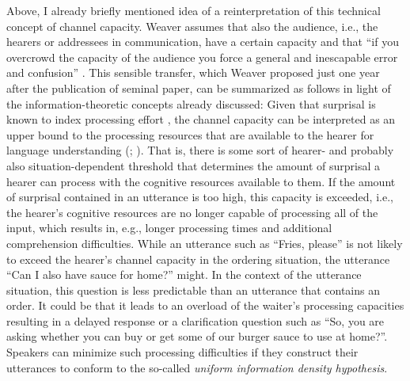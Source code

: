 Above, I already briefly mentioned  idea of a reinterpretation of this technical concept of channel capacity.  
Weaver assumes that also the audience, i.e., the hearers or addressees in communication, have a certain capacity and that ``if you overcrowd the capacity of the audience you force a general and inescapable error and confusion'' \citep[27]{weaver1949}.
This sensible transfer, which Weaver proposed just one year after the publication of  seminal paper, can be summarized as follows in light of the information-theoretic concepts already discussed:
Given that surprisal is known to index processing effort   \citep{hale2001,levy2008, demberg.keller2008}, the channel capacity  can be interpreted as an upper bound to the processing resources  that are available to the hearer for language understanding (\cite[254]{lemke2021}; \cite[see also][]{fenk.fenk1980}).
That is, there is some sort of hearer- and probably also situation-dependent threshold that determines the amount of surprisal a hearer can process with the cognitive resources available to them. 
If the amount of surprisal contained in an utterance is too high, this capacity is exceeded, i.e., the hearer's cognitive resources are no longer capable of processing all of the input, which results in, e.g., longer processing times and additional comprehension difficulties. 
While an utterance such as ``Fries, please'' is not likely to exceed the hearer's channel capacity  in the ordering situation, the utterance ``Can I also have sauce for home?'' might.
In the context of the utterance situation, this question is less predictable  than an utterance that contains an order.
It could be that it leads to an overload of the waiter's processing capacities  resulting in a delayed response or a clarification question such as ``So, you are asking whether you can buy or get some of our burger sauce to use at home?''.
Speakers can minimize such processing difficulties if they construct their utterances to conform to the so-called \textit{uniform information density hypothesis}.  

